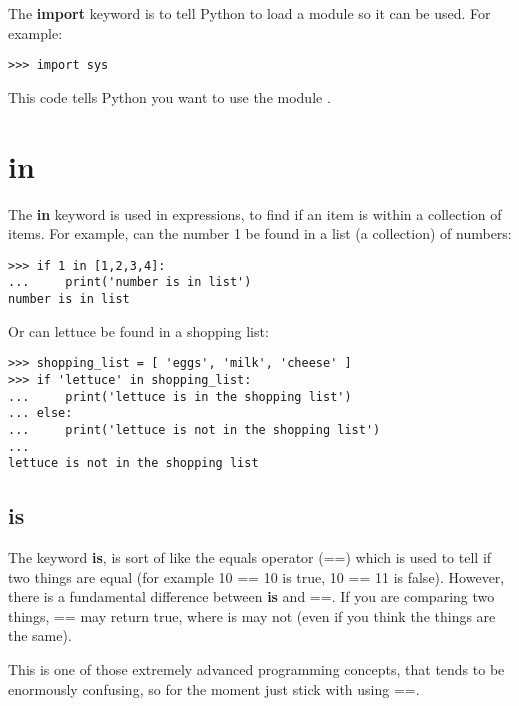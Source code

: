 The \textbf{import} keyword is to tell Python to load a module so it can be used. For example:

\begin{Verbatim}[frame=single]
>>> import sys
\end{Verbatim}

This code tells Python you want to use the module .

\section*{in}

The \textbf{in} keyword is used in expressions, to find if an item is within a collection of items. For example, can the number 1 be found in a list (a collection) of numbers:

\begin{Verbatim}[frame=single]
>>> if 1 in [1,2,3,4]:
...     print('number is in list')
number is in list
\end{Verbatim}

\noindent
Or can lettuce be found in a shopping list:

\begin{Verbatim}[frame=single]
>>> shopping_list = [ 'eggs', 'milk', 'cheese' ]
>>> if 'lettuce' in shopping_list:
...     print('lettuce is in the shopping list')
... else:
...     print('lettuce is not in the shopping list')
...
lettuce is not in the shopping list
\end{Verbatim}

\subsection*{is}

The keyword \textbf{is}, is sort of like the equals operator (==) which is used to tell if two things are equal (for example 10 == 10 is true, 10 == 11 is false).  However, there is a fundamental difference between \textbf{is} and ==. If you are comparing two things, == may return true, where is may not (even if you think the things are the same).
\par
This is one of those extremely advanced programming concepts, that tends to be enormously confusing, so for the moment just stick with using ==.

